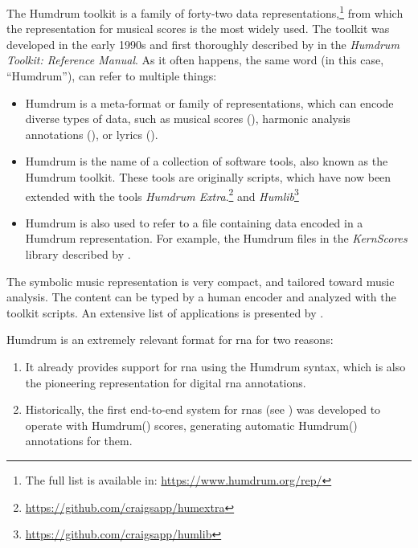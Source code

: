 


The Humdrum toolkit is a family of forty-two data
representations,\footnote{The full list is available in:
\href{https://www.humdrum.org/rep/}{https://www.humdrum.org/rep/}}
from which the  representation for musical
scores is the most widely used. The toolkit was developed in
the early 1990s and first thoroughly described by
\textcite{huron1994humdrum} in the \emph{Humdrum Toolkit:
Reference Manual}. As it often happens, the same word (in
this case, ``Humdrum''), can refer to multiple things:

\begin{itemize}
    \item Humdrum is a meta-format or family of
    representations, which can encode diverse types of data,
    such as musical scores (), harmonic
    analysis annotations (), or lyrics
    ().
    \item Humdrum is the name of a collection of software
    tools, also known as the Humdrum toolkit. These tools
    are originally  scripts, which have now been
    extended with the  tools \emph{Humdrum
    Extra}.\footnote{\href{https://github.com/craigsapp/humextra}{https://github.com/craigsapp/humextra}}
    and
    \emph{Humlib}\footnote{\href{https://github.com/craigsapp/humlib}{https://github.com/craigsapp/humlib}}
    \item Humdrum is also used to refer to a file containing
    data encoded in a Humdrum representation. For example,
    the Humdrum files in the \emph{KernScores} library
    described by \textcite{sapp2005online}.
\end{itemize}


The  symbolic music representation is very
compact, and tailored toward music analysis. The content can
be typed by a human encoder and analyzed with the toolkit
scripts. An extensive list of applications is presented by
\textcite{sapp2011computational}.


Humdrum is an extremely relevant format for \gls{rna} for
two reasons:

\begin{enumerate}
    \item It already provides support for \gls{rna} using
    the Humdrum syntax, which is also the
    pioneering representation for digital \gls{rna}
    annotations.
    \item Historically, the first end-to-end system for
    \glspl{rna} (see
    ) was developed
    to operate with Humdrum() scores,
    generating automatic Humdrum() annotations
    for them.
\end{enumerate}
